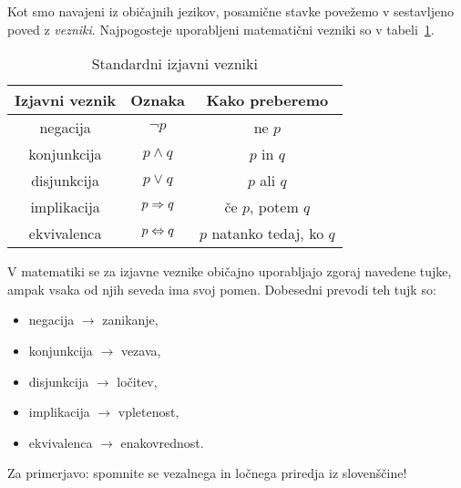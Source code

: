                 Kot smo navajeni iz običajnih jezikov, posamične stavke povežemo v sestavljeno poved z \emph{vezniki}. Najpogosteje uporabljeni matematični vezniki so v tabeli~\ref{TABELA: Standardni izjavni vezniki}.

                \begin{table}[!ht]
                        \centering
                        \begin{tabular}{|ccc|}
                                \hline
                                \textbf{Izjavni veznik} & \textbf{Oznaka} & \textbf{Kako preberemo} \\
                                \hline
                                negacija & $\lnot{p}$ & ne $p$ \\
                                konjunkcija & $p \land q$ & $p$ in $q$ \\
                                disjunkcija & $p \lor q$ & $p$ ali $q$ \\
                                implikacija & $p \Rightarrow q$ & če $p$, potem $q$ \\
                                ekvivalenca & $p \Leftrightarrow q$ & $p$ natanko tedaj, ko $q$ \\
                                \hline
                        \end{tabular}
                        \caption{Standardni izjavni vezniki}\label{TABELA: Standardni izjavni vezniki}
                \end{table}

                \begin{opomba}
                        V matematiki se za izjavne veznike običajno uporabljajo zgoraj navedene tujke, ampak vsaka od njih seveda ima svoj pomen. Dobesedni prevodi teh tujk so:
                        \begin{itemize}
                                \item
                                        negacija $\to$ zanikanje,
                                \item
                                        konjunkcija $\to$ vezava,
                                \item
                                        disjunkcija $\to$ ločitev,
                                \item
                                        implikacija $\to$ vpletenost,
                                \item
                                        ekvivalenca $\to$ enakovrednost.
                        \end{itemize}
                        Za primerjavo: spomnite se vezalnega in ločnega priredja iz slovenščine!
                \end{opomba}

